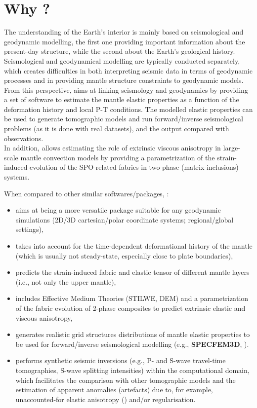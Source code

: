 \section{Why \thesistitle?}
The understanding of the Earth’s interior is mainly based on seismological and geodynamic modelling, the first one providing important information about the present-day structure, while the second about the Earth’s geological history.
Seismological and geodynamical modelling are typically conducted separately, which creates difficulties in both interpreting seismic data in terms of geodynamic processes and in providing mantle structure constraints to geodynamic models.
From this perspective, \thesistitle{} aims at linking seismology and geodynamics by providing a set of software to estimate the mantle elastic properties as a function of the deformation history and local P-T conditions. The modelled elastic properties can be used to generate tomographic models and run forward/inverse seismological problems (as it is done with real datasets), and the output compared with observations. \\
In addition, \thesistitle{} allows estimating the role of extrinsic viscous anisotropy in large-scale mantle convection models by providing a parametrization of the strain-induced evolution of the SPO-related fabrics in two-phase (matrix-inclusions) systems.

When compared to other similar softwares/packages, \thesistitle:
\begin{itemize}
    \item aims at being a more versatile package suitable for any geodynamic simulations (2D/3D  cartesian/polar coordinate systems; regional/global settings),
    \item takes into account for the time-dependent deformational history of the mantle (which is usually not steady-state, especially close to plate boundaries),
    \item predicts the strain-induced fabric and elastic tensor of different mantle layers (i.e., not only the upper mantle),
    \item includes Effective Medium Theories (STILWE, DEM) and a parametrization of the fabric evolution of 2-phase composites to predict extrinsic elastic and viscous anisotropy, 
    \item generates realistic grid structures distributions of mantle elastic properties to be used for forward/inverse seismological modelling (e.g., \textbf{SPECFEM3D}, \psitomotitle).  
    \item performs synthetic seismic inversions (e.g., P- and S-wave travel-time tomographies, S-wave splitting intensities) within the computational domain, which facilitates the comparison with other tomographic models and the estimation of apparent anomalies (artefacts) due to, for example, unaccounted-for elastic anisotropy (\citep{bezada2016g3,vanderbeek2021,vanderbeek2023}) and/or regularisation. 


\end{itemize}

